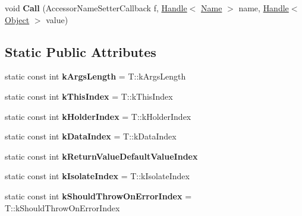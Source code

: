 \begin{DoxyCompactItemize}
\item 
void {\bfseries Call} (Accessor\+Name\+Setter\+Callback f, \hyperlink{classv8_1_1internal_1_1_handle}{Handle}$<$ \hyperlink{classv8_1_1internal_1_1_name}{Name} $>$ name, \hyperlink{classv8_1_1internal_1_1_handle}{Handle}$<$ \hyperlink{classv8_1_1internal_1_1_object}{Object} $>$ value)\hypertarget{classv8_1_1internal_1_1_property_callback_arguments_a9bec9ebb7acec707728582fa5e087c44}{}\label{classv8_1_1internal_1_1_property_callback_arguments_a9bec9ebb7acec707728582fa5e087c44}

\end{DoxyCompactItemize}
\subsection*{Static Public Attributes}
\begin{DoxyCompactItemize}
\item 
static const int {\bfseries k\+Args\+Length} = T\+::k\+Args\+Length\hypertarget{classv8_1_1internal_1_1_property_callback_arguments_a000d4d0ae04aa54cd2351d613888b755}{}\label{classv8_1_1internal_1_1_property_callback_arguments_a000d4d0ae04aa54cd2351d613888b755}

\item 
static const int {\bfseries k\+This\+Index} = T\+::k\+This\+Index\hypertarget{classv8_1_1internal_1_1_property_callback_arguments_ae7299585bfeb9b812b2ba7e09478f421}{}\label{classv8_1_1internal_1_1_property_callback_arguments_ae7299585bfeb9b812b2ba7e09478f421}

\item 
static const int {\bfseries k\+Holder\+Index} = T\+::k\+Holder\+Index\hypertarget{classv8_1_1internal_1_1_property_callback_arguments_a59f06b3272ceed23bd3599e46acd0a0f}{}\label{classv8_1_1internal_1_1_property_callback_arguments_a59f06b3272ceed23bd3599e46acd0a0f}

\item 
static const int {\bfseries k\+Data\+Index} = T\+::k\+Data\+Index\hypertarget{classv8_1_1internal_1_1_property_callback_arguments_a6158df38ec13a673626065fed0fcc2a1}{}\label{classv8_1_1internal_1_1_property_callback_arguments_a6158df38ec13a673626065fed0fcc2a1}

\item 
static const int {\bfseries k\+Return\+Value\+Default\+Value\+Index}
\item 
static const int {\bfseries k\+Isolate\+Index} = T\+::k\+Isolate\+Index\hypertarget{classv8_1_1internal_1_1_property_callback_arguments_a77f1ec88fc9fde2de666852361e1a14c}{}\label{classv8_1_1internal_1_1_property_callback_arguments_a77f1ec88fc9fde2de666852361e1a14c}

\item 
static const int {\bfseries k\+Should\+Throw\+On\+Error\+Index} = T\+::k\+Should\+Throw\+On\+Error\+Index\hypertarget{classv8_1_1internal_1_1_property_callback_arguments_a5a7bab08b2230303ee4c0196c6afaa61}{}\label{classv8_1_1internal_1_1_property_callback_arguments_a5a7bab08b2230303ee4c0196c6afaa61}

\end{DoxyCompactItemize}
